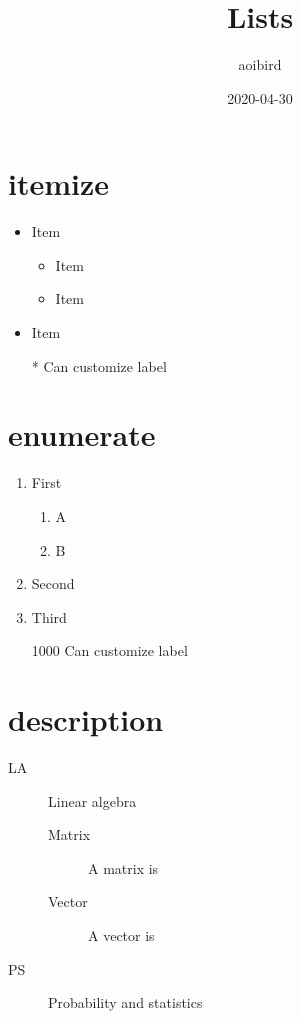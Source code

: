 \documentclass{article}
\title{Lists}
\author{aoibird}
\date{2020-04-30}
\begin{document}
\maketitle

\section{itemize}

\begin{itemize}
\item Item
  \begin{itemize}
  \item Item
  \item Item
  \end{itemize}
\item Item
\item[*] Can customize label
\end{itemize}

\section{enumerate}

\begin{enumerate}
\item First
  \begin{enumerate}
  \item A
  \item B
  \end{enumerate}
\item Second
\item Third
\item[1000] Can customize label
\end{enumerate}

\section{description}

\begin{description}
\item[LA] Linear algebra
  \begin{description}
  \item[Matrix] A matrix is
  \item[Vector] A vector is
  \end{description}
\item[PS] Probability and statistics
\end{description}
\end{document}
